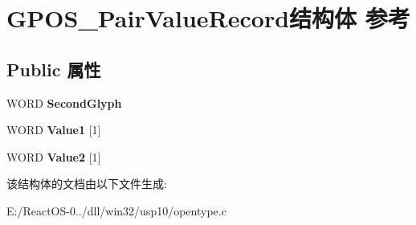 \hypertarget{struct_g_p_o_s___pair_value_record}{}\section{G\+P\+O\+S\+\_\+\+Pair\+Value\+Record结构体 参考}
\label{struct_g_p_o_s___pair_value_record}
\subsection*{Public 属性}
\begin{DoxyCompactItemize}
\item 
\mbox{\label{struct_g_p_o_s___pair_value_record_a26a6c7b9c3699b146069dd5d87036c3d}} 
W\+O\+RD {\bfseries Second\+Glyph}
\item 
\mbox{\label{struct_g_p_o_s___pair_value_record_a90ea02510ca732f1b43052d01b33ecd0}} 
W\+O\+RD {\bfseries Value1} \mbox{[}1\mbox{]}
\item 
\mbox{\label{struct_g_p_o_s___pair_value_record_a915dfc44309d8c1287708a6e945ab487}} 
W\+O\+RD {\bfseries Value2} \mbox{[}1\mbox{]}
\end{DoxyCompactItemize}


该结构体的文档由以下文件生成\+:\begin{DoxyCompactItemize}
\item 
E\+:/\+React\+O\+S-\/0../dll/win32/usp10/opentype.\+c\end{DoxyCompactItemize}
